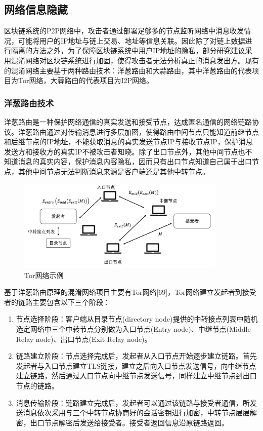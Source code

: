 \subsection{网络信息隐藏}

区块链系统的P2P网络中，攻击者通过部署足够多的节点监听网络中消息收发情况，可能将用户的IP地址与链上交易、地址等信息关联。因此除了对链上数据进行隔离的方法之外，为了保障区块链系统中用户IP地址的隐私，部分研究建议采用混淆网络对区块链系统进行加固，使得攻击者无法分析真正的消息发出方。现有的混淆网络主要基于两种路由技术：洋葱路由和大蒜路由，其中洋葱路由的代表项目为Tor网络，大蒜路由的代表项目为I2P网络。

\subsubsection{洋葱路由技术}

洋葱路由是一种保护网络通信的真实发送和接受节点，达成匿名通信的网络链路协议。洋葱路由通过对传输消息进行多层加密，使得路由中间节点只能知道前继节点和后继节点的IP地址，不能获取消息的真实发送节点IP与接收节点IP，保护消息发送方和接收方的真实IP不被攻击者知晓。除了出口节点外，其他中间节点也不知道消息的真实内容，保护消息内容隐私，因而只有出口节点知道自己属于出口节点，其他中间节点无法判断消息来源是客户端还是其他中转节点。

\begin{figure}
\centering
\includegraphics[width=10cm]{figures/tor.png}
\caption{Tor网络示例}
\label{fig:tor}
\end{figure}

基于洋葱路由原理的混淆网络项目主要有Tor网络[69]，Tor网络建立发起者到接受者的链路主要包含以下三个阶段：

\begin{enumerate}
	\item 节点选择阶段：客户端从目录节点(directory node)提供的中转接点列表中随机选定网络中三个中转节点分别做为入口节点(Entry node)、中继节点(Middle Relay node)、出口节点(Exit Relay node)。
	\item 链路建立阶段：节点选择完成后，发起者从入口节点开始逐步建立链路。首先发起者与入口节点建立TLS链接，建立之后向入口节点发送信号，向中继节点建立链路，然后通过入口节点向中继节点发送信号，同样建立中继节点到出口节点的链路。
	\item 消息传输阶段：链路建立完成后，发起者可以通过该链路与接受者通信，所发送消息依次采用与三个中转节点协商好的会话密钥进行加密，中转节点层层解密，出口节点解密后发送给接受者。接受者返回信息沿原链路返回。
\end{enumerate}

